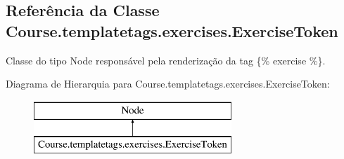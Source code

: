\hypertarget{classCourse_1_1templatetags_1_1exercises_1_1ExerciseToken}{}\subsection{Referência da Classe Course.\+templatetags.\+exercises.\+Exercise\+Token}
\label{classCourse_1_1templatetags_1_1exercises_1_1ExerciseToken}


Classe do tipo Node responsável pela renderização da tag \{\% exercise \%\}.  


Diagrama de Hierarquia para Course.\+templatetags.\+exercises.\+Exercise\+Token\+:\begin{figure}[H]
\begin{center}
\leavevmode
\includegraphics[height=2.000000cm]{dc/d8f/classCourse_1_1templatetags_1_1exercises_1_1ExerciseToken}
\end{center}
\end{figure}
